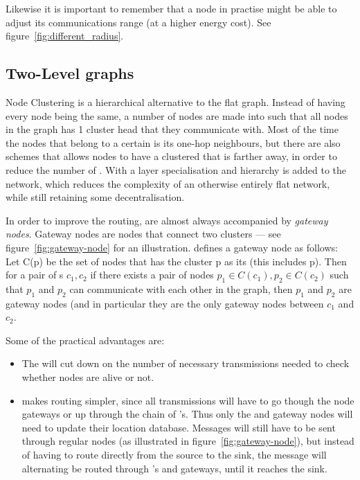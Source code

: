 
Likewise it is important to remember that a node in practise might be able to adjust its communications range (at a higher energy cost). See figure~\ref{fig:different_radius}.

\subsection{Two-Level graphs}

\label{cluster methods}
Node Clustering is a hierarchical alternative to the flat graph. Instead of having every node being the same, a number of nodes are made into \ch such that all nodes in the graph has 1 cluster head that they communicate with. Most of the time the nodes that belong to a certain \ch is its one-hop neighbours, but there are also schemes that allows nodes to have a clustered that is farther away, in order to reduce the number of \ch. With \ch a layer specialisation and hierarchy is added to the network, which reduces the complexity of an otherwise entirely flat network, while still retaining some decentralisation.

In order to improve the routing, \ch are almost always accompanied by \emph{gateway nodes}. Gateway nodes are nodes that connect two clusters --- see figure~\ref{fig:gateway-node} for an illustration. \cite{spanners} defines a gateway node as follows:
Let C(p) be the set of nodes that has the cluster p as its \ch (this includes p). Then for a pair of \ch s $c_1, c_2$ if there exists a pair of nodes $p_1 \in C(c_1), p_2 \in C(c_2)$ such that $p_1$ and $p_2$ can communicate with each other in the graph, then $p_1$ and $p_2$ are gateway nodes (and in particular they are the only gateway nodes between $c_1$ and $c_2$.  

Some of the practical advantages are:
\begin{itemize}
\item The \ch will cut down on the number of necessary transmissions needed to check whether nodes are alive or not.
\item \ch makes routing simpler, since all transmissions will have to go though the node gateways or up through the chain of \ch's. Thus only the \ch and gateway nodes will need to update their location database. Messages will still have to be sent through regular nodes (as illustrated in figure~\ref{fig:gateway-node}), but instead of having to route directly from the source to the sink, the message will alternating be routed through \ch's and gateways, until it reaches the sink.
\end{itemize}

